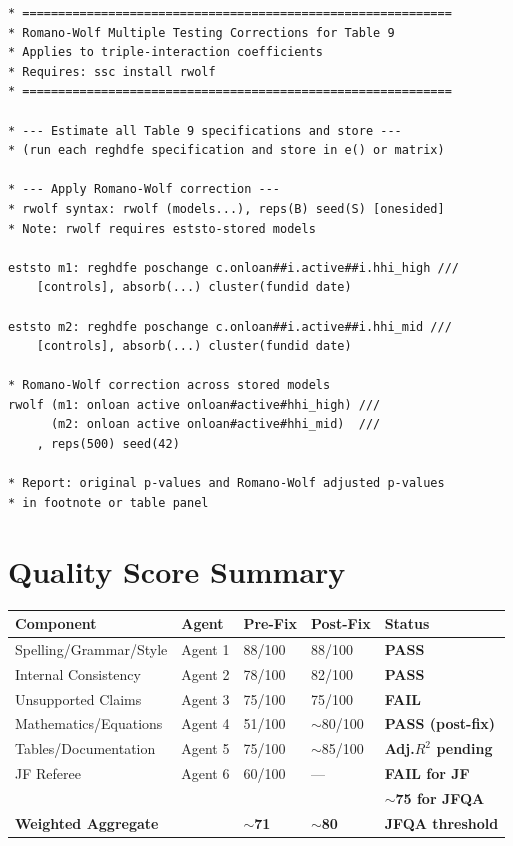 \documentclass[11pt, a4paper]{article}
\begin{document}
\begin{lstlisting}[language={}]
* ============================================================
* Romano-Wolf Multiple Testing Corrections for Table 9
* Applies to triple-interaction coefficients
* Requires: ssc install rwolf
* ============================================================

* --- Estimate all Table 9 specifications and store ---
* (run each reghdfe specification and store in e() or matrix)

* --- Apply Romano-Wolf correction ---
* rwolf syntax: rwolf (models...), reps(B) seed(S) [onesided]
* Note: rwolf requires eststo-stored models

eststo m1: reghdfe poschange c.onloan##i.active##i.hhi_high ///
    [controls], absorb(...) cluster(fundid date)

eststo m2: reghdfe poschange c.onloan##i.active##i.hhi_mid ///
    [controls], absorb(...) cluster(fundid date)

* Romano-Wolf correction across stored models
rwolf (m1: onloan active onloan#active#hhi_high) ///
      (m2: onloan active onloan#active#hhi_mid)  ///
    , reps(500) seed(42)

* Report: original p-values and Romano-Wolf adjusted p-values
* in footnote or table panel
\end{lstlisting}

\section{Quality Score Summary}

\begin{center}
\begin{longtable}{lllll}
\toprule
\textbf{Component} & \textbf{Agent} & \textbf{Pre-Fix} & \textbf{Post-Fix} & \textbf{Status} \\
\midrule
\endhead
Spelling/Grammar/Style & Agent 1 & 88/100 & 88/100 & \textcolor{mingreen}{\textbf{PASS}} \\
Internal Consistency & Agent 2 & 78/100 & 82/100 & \textcolor{mingreen}{\textbf{PASS}} \\
Unsupported Claims & Agent 3 & 75/100 & 75/100 & \textcolor{critred}{\textbf{FAIL}} \\
Mathematics/Equations & Agent 4 & 51/100 & $\sim$80/100 & \textcolor{mingreen}{\textbf{PASS (post-fix)}} \\
Tables/Documentation & Agent 5 & 75/100 & $\sim$85/100 & \textcolor{majblue}{\textbf{Adj.$R^2$ pending}} \\
JF Referee & Agent 6 & 60/100 & --- & \textcolor{critred}{\textbf{FAIL for JF}} \\
& & & & \textcolor{majblue}{\textbf{$\sim$75 for JFQA}} \\
\midrule
\textbf{Weighted Aggregate} & & \textbf{$\sim$71} & \textbf{$\sim$80} & \textcolor{majblue}{\textbf{JFQA threshold}} \\
\bottomrule
\end{longtable}
\end{center}
\end{document}
